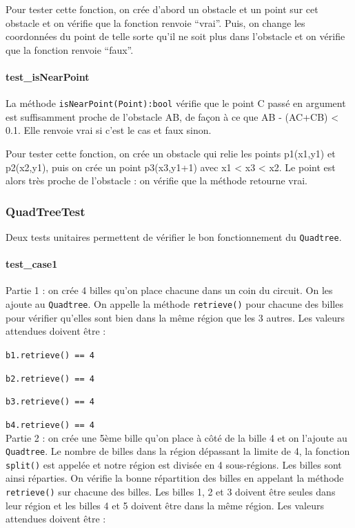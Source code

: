 \documentclass{report}
\begin{document}
Pour tester cette fonction, on crée d’abord un obstacle et un point sur cet obstacle et on vérifie que la fonction renvoie “vrai”. Puis, on change les coordonnées du point de telle sorte qu’il ne soit plus dans l’obstacle et on vérifie que la fonction renvoie “faux”.

\paragraph{test\_isNearPoint}

La méthode \texttt{isNearPoint(Point):bool} vérifie que le point C passé en argument est suffisamment proche de l’obstacle AB, de façon à ce que AB - (AC+CB) < 0.1. Elle renvoie vrai si c’est le cas et faux sinon.

Pour tester cette fonction, on crée un obstacle qui relie les points p1(x1,y1) et p2(x2,y1), puis on crée un point p3(x3,y1+1) avec x1 < x3 < x2. Le point est alors très proche de l’obstacle : on vérifie que la méthode retourne vrai.

\newpage
\subsubsection{QuadTreeTest}

Deux tests unitaires permettent de vérifier le bon fonctionnement du \texttt{Quadtree}.

\paragraph{test\_case1}

Partie 1 : on crée 4 billes qu’on place chacune dans un coin du circuit. On les ajoute au \texttt{Quadtree}. On appelle la méthode \texttt{retrieve()} pour chacune des billes pour vérifier qu’elles sont bien dans la même région que les 3 autres. Les valeurs attendues doivent être :

\texttt{b1.retrieve() == 4}

\texttt{b2.retrieve() == 4}

\texttt{b3.retrieve() == 4}

\texttt{b4.retrieve() == 4} \\

Partie 2 : on crée une 5ème bille qu’on place à côté de la bille 4 et on l’ajoute au \texttt{Quadtree}. Le nombre de billes dans la région dépassant la limite de 4, la fonction \texttt{split()} est appelée et notre région est divisée en 4 sous-régions. Les billes sont ainsi réparties. On vérifie la bonne répartition des billes en appelant la méthode \texttt{retrieve()} sur chacune des billes. Les billes 1, 2 et 3 doivent être seules dans leur région et les billes 4 et 5 doivent être dans la même région. Les valeurs attendues doivent être :
\end{document}
